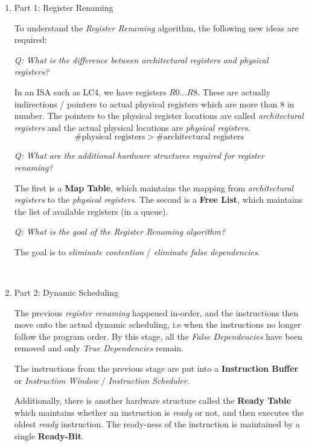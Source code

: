\documentclass[12pt]{article}
\newenvironment{QandA}{\begin{enumerate}[label=\bfseries\arabic*.]\bfseries}
                      {\end{enumerate}}
\newenvironment{answered}{\par\quad\normalfont}{}
\begin{document}
\begin{QandA}
\ 

\item Part 1: Register Renaming
\begin{answered}
To understand the \textit{Register Renaming} algorithm, the following new ideas are required:

\textit{Q: What is the difference between architectural registers and physical registers?}

\quad In an ISA such as LC4, we have registers $R0...R8$. These are actually indirections / pointers to actual physical registers which are more than 8 in number. The pointers to the physical register locations are called \textit{architectural registers} and the actual physical locations are \textit{physical registers}.
\begin{equation*}
    \#\text{physical registers} > \#\text{architectural registers}
\end{equation*}

\textit{Q: What are the additional hardware structures required for register renaming?}

\quad The first is a \textbf{Map Table}, which maintains the mapping from \textit{architectural registers} to the \textit{physical registers}. The second is a \textbf{Free List}, which maintains the list of available registers (in a queue). 

\textit{Q: What is the goal of the Register Renaming algorithm?}

\quad The goal is to \textit{eliminate contention} / \textit{eliminate false dependencies}. 
\end{answered}

\ 

\item Part 2: Dynamic Scheduling
\begin{answered}
The previous \textit{register renaming} happened in-order, and the instructions then move onto the actual dynamic scheduling, i.e when the instructions no longer follow the program order. By this stage, all the \textit{False Dependencies} have been removed and only \textit{True Dependencies} remain. 

The instructions from the previous stage are put into a \textbf{Instruction Buffer} or \textit{Instruction Window} / \textit{Instruction Scheduler}. 

Additionally, there is another hardware structure called the \textbf{Ready Table} which maintains whether an instruction is \textit{ready} or not, and then executes the oldest \textit{ready} instruction. The ready-ness of the instruction is maintained by a single \textbf{Ready-Bit}. 


\end{answered}
\end{QandA}
\end{document}
